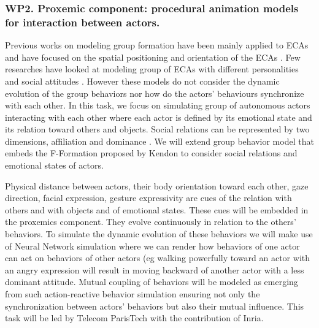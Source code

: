 

\subsubsection{WP2. Proxemic component: procedural animation models for interaction between actors.}

Previous works on modeling group formation have been mainly applied to ECAs and have focused on the spatial positioning and orientation of the ECAs \cite{Pedica2010}. Few researches have looked at modeling group of ECAs with different personalities and social attitudes \cite{Gillies2004,Prada2005}. However these models do not consider the dynamic evolution of the group behaviors nor how do the actors' behaviours synchronize with each other. In this task, we focus on simulating group of autonomous actors interacting with each other where each actor is defined by its emotional state and its relation toward others and objects. Social relations can be represented by two dimensions, affiliation and dominance \cite{Wiggins1979}. We will extend group behavior model \cite{Pedica2010} that embeds the F-Formation proposed by Kendon \cite{Kendon2004} to consider social relations and emotional states of actors. 

Physical distance between actors, their body orientation toward each other, gaze direction, facial expression, gesture expressivity are cues of the relation with others and with objects and of emotional states. These cues will be embedded in the proxemics component. They evolve continuously in relation to the others' behaviors. To simulate the dynamic evolution of these behaviors we will make use of Neural Network simulation \cite{Prepin2013} where we can render how behaviors of one actor can act on behaviors of other actors (eg walking powerfully toward an actor with an angry expression will result in moving backward of another actor with a less dominant attitude. Mutual coupling of behaviors will be modeled as emerging from such action-reactive behavior simulation \cite{Prepin2013} ensuring not only the synchronization between actors' behaviors but also their mutual influence. This task will be led by Telecom ParisTech with the contribution of Inria.



\endinput